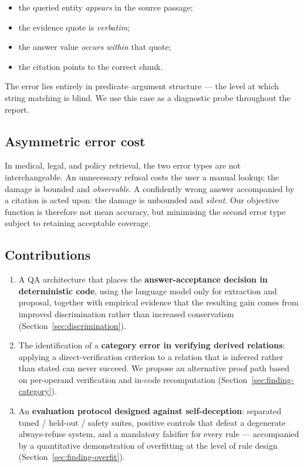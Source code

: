 \documentclass[conference]{IEEEtran}
\begin{document}
\begin{itemize}
  \item the queried entity \emph{appears} in the source passage;
  \item the evidence quote is \emph{verbatim};
  \item the answer value \emph{occurs within} that quote;
  \item the citation points to the correct chunk.
\end{itemize}

The error lies entirely in predicate--argument structure --- the level at which
string matching is blind. We use this case as a diagnostic probe throughout the
report.

\subsection{Asymmetric error cost}

In medical, legal, and policy retrieval, the two error types are not
interchangeable. An unnecessary refusal costs the user a manual lookup: the
damage is bounded and \emph{observable}. A confidently wrong answer accompanied by
a citation is acted upon: the damage is unbounded and \emph{silent}. Our
objective function is therefore not mean accuracy, but minimising the second
error type subject to retaining acceptable coverage.

\subsection{Contributions}

\begin{enumerate}
  \item A QA architecture that places the \textbf{answer-acceptance decision in
        deterministic code}, using the language model only for extraction and
        proposal, together with empirical evidence that the resulting gain comes
        from improved discrimination rather than increased conservatism
        (Section~\ref{sec:discrimination}).
  \item The identification of a \textbf{category error in verifying derived
        relations}: applying a direct-verification criterion to a relation that
        is inferred rather than stated can never succeed. We propose an
        alternative proof path based on per-operand verification and in-code
        recomputation (Section~\ref{sec:finding-category}).
  \item An \textbf{evaluation protocol designed against self-deception}:
        separated tuned / held-out / safety suites, positive controls that defeat
        a degenerate always-refuse system, and a mandatory falsifier for every
        rule --- accompanied by a quantitative demonstration of overfitting at
        the level of rule design (Section~\ref{sec:finding-overfit}).
\end{enumerate}
\end{document}
